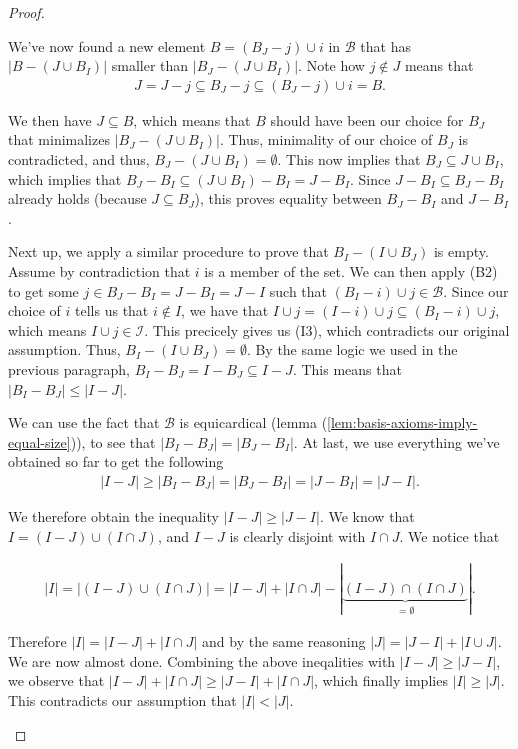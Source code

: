 \begin{proof}
\begin{enumerate}
        We've now found a new element $B=(B_J-j)\cup i$ in $\mathcal{B}$ that has $|B-(J\cup B_I)|$ smaller than $|B_J-(J\cup B_I)|$. Note how $j\notin J$ means that 
        \begin{align*}
        J=J-j\subseteq B_J-j\subseteq (B_J-j)\cup i = B. 
        \end{align*}

        We then have $J\subseteq B$, which means that $B$ should have been our choice for $B_J$ that minimalizes $|B_J-(J\cup B_I)|$. Thus, minimality of our choice of $B_J$ is contradicted, and thus, $B_J-(J\cup B_I)=\emptyset$. This now implies that $B_J\subseteq J\cup B_I$, which implies that $B_J-B_I\subseteq (J\cup B_I)-B_I=J-B_I$. Since $J-B_I\subseteq B_J-B_I$ already holds (because $J\subseteq B_J$), this proves equality between $B_J-B_I$ and $J-B_I$.

        Next up, we apply a similar procedure to prove that $B_I-(I\cup B_J)$ is empty. Assume by contradiction that $i$ is a member of the set. We can then apply (B2) to get some $j\in B_J-B_I=J-B_I=J-I$ such that $(B_I-i)\cup j\in\mathcal{B}$. Since our choice of $i$ tells us that $i \notin I$, we have that $I\cup j = (I-i)\cup j \subseteq (B_I-i)\cup j$, which means $I\cup j\in\mathcal{I}$. This precicely gives us (I3), which contradicts our original assumption. Thus, $B_I-(I\cup B_J)=\emptyset$. By the same logic we used in the previous paragraph, $B_I-B_J=I-B_J\subseteq I-J$. This means that $|B_I-B_J|\leq|I-J|$.

        We can use the fact that $\mathcal{B}$ is equicardical (lemma (\ref{lem:basis-axioms-imply-equal-size})), to see that $|B_I-B_J|=|B_J-B_I|$. At last, we use everything we've obtained so far to get the following
        \begin{align*}
        |I-J|\geq |B_I-B_J|=|B_J-B_I|=|J-B_I|=|J-I|.
        \end{align*}

        We therefore obtain the inequality $|I - J|\geq |J - I|$. We know that $ I = (I - J) \cup (I\cap J)$, and $I - J$ is clearly disjoint with $I \cap J$. We notice that

        \begin{align*}
        |I| = |(I - J)\cup (I \cap J)| = |I - J| + |I \cap J| - |\underbrace{(I - J) \cap (I \cap J)}_{ = \emptyset}|.
        \end{align*}

        Therefore $|I| = |I-J| + |I \cap J|$ and by the same reasoning $|J| = |J - I| + |I\cup J|$. We are now almost done. Combining the above ineqalities with $|I - J|\geq |J - I|$, we observe that $|I-J| +|I \cap J|\geq |J - I| + |I \cap J|$, which finally implies $|I|\geq |J|$. This contradicts our assumption that $|I|< |J|$. 
        

\end{enumerate}
\end{proof}
